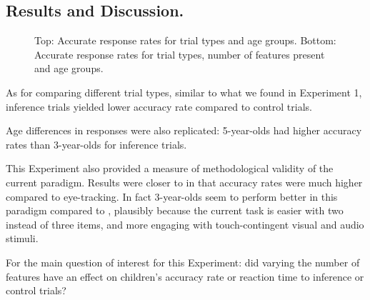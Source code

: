 \documentclass[10pt,letterpaper]{article}
\begin{document}
\subsection{Results and Discussion.}

\begin{figure}
	\caption{\label{fig:mixnumAcc} Top: Accurate response rates for trial types and age groups. Bottom: Accurate response rates for trial types, number of features present and age groups.}
\end{figure}

As for comparing different trial types, similar to what we found in Experiment 1, inference trials yielded lower accuracy rate compared to control trials.

Age differences in responses were also replicated: 5-year-olds had higher accuracy rates than 3-year-olds for inference trials.

This Experiment also provided a measure of methodological validity of the current paradigm. Results were closer to  in that accuracy rates were much higher compared to eye-tracking. In fact 3-year-olds seem to perform better in this paradigm compared to , plausibly because the current task is easier with two instead of three items, and more engaging with touch-contingent visual and audio stimuli.

For the main question of interest for this Experiment: did varying the number of features have an effect on children's accuracy rate or reaction time to inference or control trials?
\end{document}
